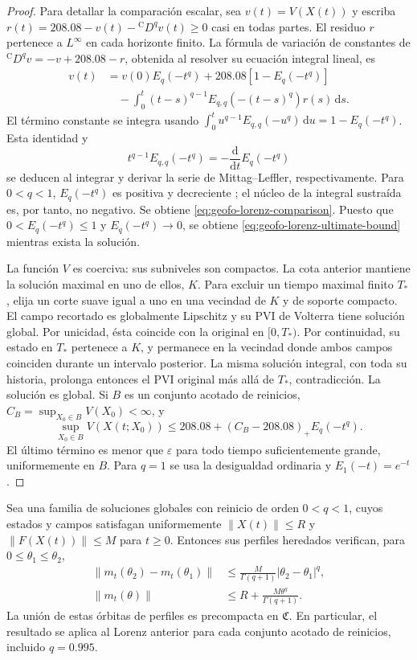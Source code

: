 \begin{proof}
Para detallar la comparación escalar, sea \(v(t)=V(X(t))\) y escriba
\(r(t)=208.08-v(t)-{}^{\mathrm C}D^qv(t)\geq0\) casi en todas partes.
El residuo \(r\) pertenece a \(L^\infty\) en cada horizonte finito.
La fórmula de variación de constantes de
\({}^{\mathrm C}D^qv=-v+208.08-r\), obtenida al resolver su ecuación
integral lineal, es
\begin{align*}
 v(t)&=v(0)E_q(-t^q)+208.08[1-E_q(-t^q)]\\
 &\quad-\int_0^t(t-s)^{q-1}E_{q,q}(-(t-s)^q)r(s)\,\mathrm ds.
\end{align*}
El término constante se integra usando
\(\int_0^t u^{q-1}E_{q,q}(-u^q)\,\mathrm du=1-E_q(-t^q)\).
Esta identidad y
\[
 t^{q-1}E_{q,q}(-t^q)
 =-\frac{\mathrm d}{\mathrm dt}E_q(-t^q)
\]
se deducen al integrar y derivar la serie de Mittag--Leffler, respectivamente.
Para \(0<q<1\), \(E_q(-t^q)\) es positiva y decreciente
\cite{Podlubny1999}; el núcleo de la integral sustraída es, por tanto,
no negativo. Se obtiene
\cref{eq:geofo-lorenz-comparison}. Puesto que
\(0<E_q(-t^q)\leq1\) y \(E_q(-t^q)\to0\), se obtiene
\cref{eq:geofo-lorenz-ultimate-bound} mientras exista la solución.

La función \(V\) es coerciva: sus subniveles son compactos. La cota anterior
mantiene la solución maximal en uno de ellos, \(K\). Para excluir un tiempo
maximal finito \(T_*\), elija un corte suave igual a uno en una vecindad de
\(K\) y de soporte compacto. El campo recortado es globalmente Lipschitz y
su PVI de Volterra tiene solución global. Por unicidad, ésta coincide con la
original en \([0,T_*)\). Por continuidad, su estado en \(T_*\) pertenece
a \(K\), y permanece en la vecindad donde ambos campos coinciden durante
un intervalo posterior. La misma solución integral, con toda su historia,
prolonga entonces el PVI original más allá de \(T_*\), contradicción.
La solución es global. Si \(B\) es un
conjunto acotado de reinicios, \(C_B=\sup_{X_0\in B}V(X_0)<\infty\), y
\[
 \sup_{X_0\in B}V(X(t;X_0))
 \leq208.08+(C_B-208.08)_+E_q(-t^q).
\]
El último término es menor que \(\varepsilon\) para todo tiempo
suficientemente grande, uniformemente en \(B\). Para \(q=1\) se usa
la desigualdad ordinaria y \(E_1(-t)=e^{-t}\).
\end{proof}

\begin{proposition}
\label{prop:geofo-profile-precompact}
Sea una familia de soluciones globales con reinicio de orden
\(0<q<1\), cuyos estados y campos satisfagan uniformemente
\(\|X(t)\|\leq R\) y \(\|F(X(t))\|\leq M\) para \(t\geq0\).
Entonces sus perfiles heredados verifican, para
\(0\leq\theta_1\leq\theta_2\),
\begin{align}
 \|m_t(\theta_2)-m_t(\theta_1)\|
 &\leq\frac{M}{\Gamma(q+1)}|\theta_2-\theta_1|^q,
 \label{eq:geofo-profile-holder}\\
 \|m_t(\theta)\|&\leq R+\frac{M\theta^q}{\Gamma(q+1)}.
 \label{eq:geofo-profile-bound}
\end{align}
La unión de estas órbitas de perfiles es precompacta en
\(\mathfrak C\). En particular, el resultado se aplica al Lorenz anterior
para cada conjunto acotado de reinicios, incluido \(q=0.995\).
\end{proposition}

